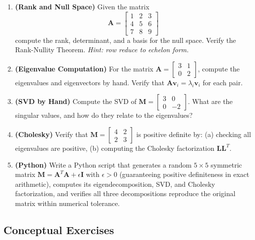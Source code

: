 \begin{enumerate}
    \item \textbf{(Rank and Null Space)} Given the matrix
    \begin{equation*}
        \mathbf{A} = \begin{bmatrix} 1 & 2 & 3 \\ 4 & 5 & 6 \\ 7 & 8 & 9 \end{bmatrix}
    \end{equation*}
    compute the rank, determinant, and a basis for the null space. Verify the Rank-Nullity Theorem. \emph{Hint: row reduce to echelon form.}

    \item \textbf{(Eigenvalue Computation)} For the matrix $\mathbf{A} = \begin{bmatrix} 3 & 1 \\ 0 & 2 \end{bmatrix}$, compute the eigenvalues and eigenvectors by hand. Verify that $\mathbf{A}\mathbf{v}_i = \lambda_i \mathbf{v}_i$ for each pair.

    \item \textbf{(SVD by Hand)} Compute the SVD of $\mathbf{M} = \begin{bmatrix} 3 & 0 \\ 0 & -2 \end{bmatrix}$. What are the singular values, and how do they relate to the eigenvalues?

    \item \textbf{(Cholesky)} Verify that $\mathbf{M} = \begin{bmatrix} 4 & 2 \\ 2 & 3 \end{bmatrix}$ is positive definite by: (a) checking all eigenvalues are positive, (b) computing the Cholesky factorization $\mathbf{L}\mathbf{L}^T$.

    \item \textbf{(Python)} Write a Python script that generates a random $5 \times 5$ symmetric matrix $\mathbf{M} = \mathbf{A}^T\mathbf{A} + \epsilon \mathbf{I}$ with $\epsilon>0$ (guaranteeing positive definiteness in exact arithmetic), computes its eigendecomposition, SVD, and Cholesky factorization, and verifies all three decompositions reproduce the original matrix within numerical tolerance.
\end{enumerate}

\subsection*{Conceptual Exercises}


